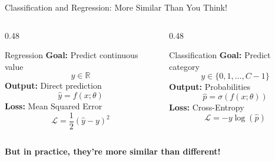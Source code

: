 \documentclass[xcolor=svgnames, 8pt, handout, standalone]{beamer}
\newcommand{\1}{\mathbf{1}}
\begin{document}
\begin{frame}{Classification and Regression: More Similar Than You Think!}
\begin{columns}
\begin{column}{0.48\textwidth}
\begin{block}{Regression}
\textbf{Goal:} Predict continuous value
\begin{equation*}
y \in \mathbb{R}
\end{equation*}
\textbf{Output:} Direct prediction
\begin{equation*}
\hat{y} = f(x; \theta)
\end{equation*}
\textbf{Loss:} Mean Squared Error
\begin{equation*}
\mathcal{L} = \frac{1}{2}(\hat{y} - y)^2
\end{equation*}
\end{block}
\end{column}
\begin{column}{0.48\textwidth}
\begin{block}{Classification}
\textbf{Goal:} Predict category
\begin{equation*}
y \in \{0, 1, \ldots, C-1\}
\end{equation*}
\textbf{Output:} Probabilities
\begin{equation*}
\hat{p} = \sigma(f(x; \theta))
\end{equation*}
\textbf{Loss:} Cross-Entropy
\begin{equation*}
\mathcal{L} = -y\log(\hat{p})
\end{equation*}
\end{block}
\end{column}
\end{columns}

\vspace{0.5cm}
\pause
\begin{tcolorbox}[colback=lightyellow, colframe=hotpink, boxrule=2pt]
\centering
\textbf{But in practice, they're more similar than different!}
\end{tcolorbox}
\end{frame}
\end{document}

